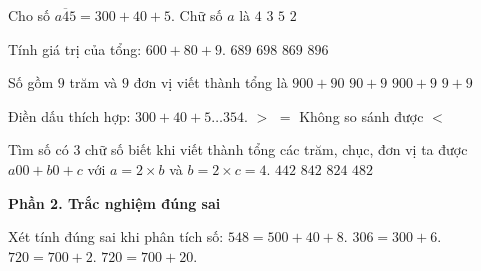 \begin{ex} %
Cho số $\overline{a45} = 300 + 40 + 5$. Chữ số $a$ là
\choice
{$4$}
{\True $3$}
{$5$}
{$2$}
\end{ex}

\begin{ex} %
Tính giá trị của tổng: $600 + 80 + 9$.
\choice
{\True $689$}
{$698$}
{$869$}
{$896$}
\end{ex}

\begin{ex} %
Số gồm $9$ trăm và $9$ đơn vị viết thành tổng là
\choice
{$900 + 90$}
{$90 + 9$}
{\True $900 + 9$}
{$9 + 9$}
\end{ex}

\begin{ex} %
Điền dấu thích hợp: $300 + 40 + 5 \dots 354$.
\choice
{$>$}
{$=$}
{Không so sánh được}
{\True $<$}
\end{ex}

\begin{ex} %
Tìm số có 3 chữ số biết khi viết thành tổng các trăm, chục, đơn vị ta được $a00 + b0 + c$ với $a = 2 \times b$ và $b = 2 \times c = 4$.
\choice
{$442$}
{\True $842$}
{$824$}
{$482$}
\end{ex}

\textbf{Phần 2. Trắc nghiệm đúng sai}

\begin{ex} %
Xét tính đúng sai khi phân tích số:
\choiceTF
{\True $548 = 500 + 40 + 8$.}
{\True $306 = 300 + 6$.}
{$720 = 700 + 2$.}
{\True $720 = 700 + 20$.}
\end{ex}

